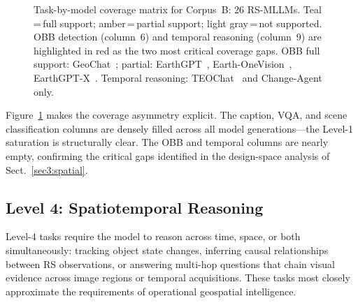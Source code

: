 \begin{figure}[h]
\caption{Task-by-model coverage matrix for Corpus~B: 26 RS-MLLMs. Teal\,=\,full
support; amber\,=\,partial support; light gray\,=\,not supported. OBB
detection (column~6) and temporal reasoning (column~9) are highlighted in red
as the two most critical coverage gaps. OBB full support: GeoChat~\cite{geochat2024};
partial: EarthGPT~\cite{earthgpt2025}, Earth-OneVision~\cite{earthonevision2026},
EarthGPT-X~\cite{earthgptx2026}. Temporal reasoning:
TEOChat~\cite{teochat2025} and Change-Agent~\cite{changeagent2025} only.}\label{fig:task_coverage}
\end{figure}

Figure~\ref{fig:task_coverage} makes the coverage asymmetry explicit. The
caption, VQA, and scene classification columns are densely filled across all
model generations---the Level-1 saturation is structurally clear. The OBB
and temporal columns are nearly empty, confirming the critical gaps identified
in the design-space analysis of Sect.~\ref{sec3:spatial}.

\subsection{Level 4: Spatiotemporal Reasoning}\label{sec4:reason}

Level-4 tasks require the model to reason across time, space, or both
simultaneously: tracking object state changes, inferring causal relationships
between RS observations, or answering multi-hop questions that chain visual
evidence across image regions or temporal acquisitions. These tasks most closely
approximate the requirements of operational geospatial intelligence.

